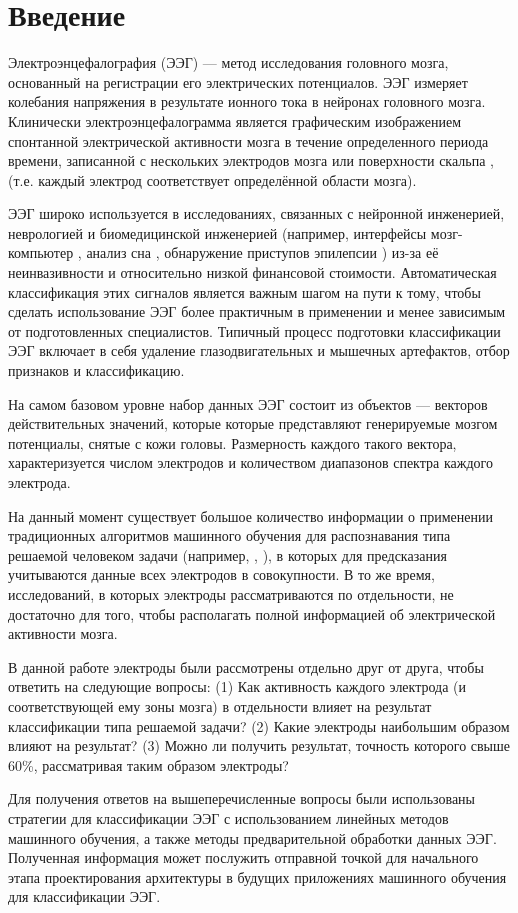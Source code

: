 
\vspace*{3mm}
\section{Введение}

\vspace*{7mm}
Электроэнцефалография (ЭЭГ) --- метод исследования головного мозга, основанный на
регистрации его электрических потенциалов. ЭЭГ измеряет колебания напряжения в
результате ионного тока в нейронах головного мозга. Клинически электроэнцефалограмма
является графическим изображением спонтанной электрической активности мозга в течение
определенного периода времени, записанной с нескольких электродов мозга или
поверхности скальпа \cite{EEG}, (т.е. каждый электрод соответствует определённой
области мозга).

ЭЭГ широко используется в исследованиях, связанных с нейронной инженерией, неврологией
и биомедицинской инженерией (например, интерфейсы мозг-компьютер \cite{EEG_app1},
анализ сна \cite{EEG_app2}, обнаружение приступов эпилепсии \cite{EEG_app3}) из-за
её неинвазивности и относительно низкой финансовой стоимости. Автоматическая
классификация этих сигналов является важным шагом на пути к тому, чтобы сделать
использование ЭЭГ более практичным в применении и менее зависимым от подготовленных
специалистов. Типичный процесс подготовки классификации ЭЭГ включает в себя удаление 
глазодвигательных и мышечных артефактов, отбор признаков и классификацию.

На самом базовом уровне набор данных ЭЭГ состоит из объектов --- векторов действительных
значений, которые которые представляют генерируемые мозгом потенциалы, снятые с кожи
головы. Размерность каждого такого вектора, характеризуется числом электродов и
количеством диапазонов спектра каждого электрода.

На данный момент существует большое количество информации о применении традиционных
алгоритмов машинного обучения для распознавания типа решаемой человеком задачи
(например, \cite{emotion_class1}, \cite{emotion_class2}), в которых для предсказания
учитываются данные всех электродов в совокупности. В то же время, исследований, в которых
электроды рассматриваются по отдельности, не достаточно для того, чтобы располагать полной
информацией об электрической активности мозга. 

\newpage
\vspace*{10mm}
В данной работе электроды были рассмотрены отдельно друг от друга, чтобы ответить на следующие
вопросы: (1) Как активность каждого электрода (и соответствующей ему зоны мозга) в отдельности
влияет на результат классификации типа решаемой задачи? (2) Какие электроды наибольшим
образом влияют на результат? (3) Можно ли получить результат, точность которого свыше 60\%, 
рассматривая таким образом электроды?

Для получения ответов на вышеперечисленные вопросы были использованы стратегии для классификации
ЭЭГ с использованием линейных методов машинного обучения, а также методы предварительной обработки
данных ЭЭГ. Полученная информация может послужить отправной точкой для начального этапа проектирования
архитектуры в будущих приложениях машинного обучения для классификации ЭЭГ. 